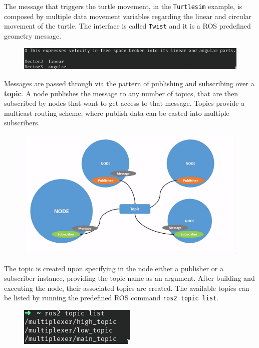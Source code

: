 The message that triggers the turtle movement, in the \texttt{Turtlesim} example, is composed by multiple data movement variables regarding the linear and circular movement of the turtle. The interface is called \texttt{Twist} and it is a ROS predefined geometry message.

\begin{figure}[H]
        \centering
         \includegraphics[width=0.7\linewidth]{images/ts_interface_twist.png}
\end{figure}
            
Messages are passed through via the pattern of publishing and subscribing over a \textbf{topic}. A node publishes the message to any number of topics, that are then subscribed by nodes that want to get access to that message. Topics provide a multicast routing scheme, where publish data can be casted into multiple subscribers.

\begin{figure}[H]
        \centering
        \includegraphics[width=0.7\linewidth]{images/ros2-topics.png}
\end{figure}
            
The topic is created upon specifying in the node either a publisher or a subscriber instance, providing the topic name as an argument. After building and executing the node, their associated topics are created. The available topics can be listed by running the predefined ROS command \texttt{ros2 topic list}.
            
\begin{figure}[H]
        \centering
         \includegraphics[width=0.3\linewidth]{images/ts_topiclist.png}
\end{figure}
            
